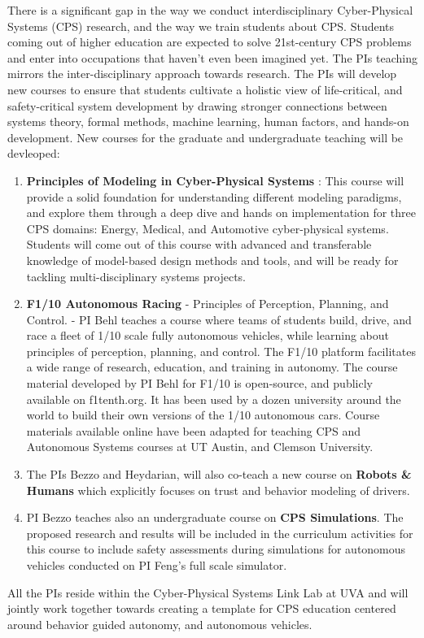 There is a significant gap in the way we conduct interdisciplinary Cyber-Physical Systems (CPS) research, and the way we train students about CPS. Students coming out of higher education are expected to solve 21st-century CPS problems and enter into occupations that haven’t even been imagined yet. The PIs teaching mirrors the inter-disciplinary approach towards research. 
The PIs will develop new courses to ensure that students cultivate a holistic view of life-critical, and safety-critical system development by drawing stronger connections between systems theory, formal methods, machine learning, human factors, and hands-on development.
New courses for the graduate and undergraduate teaching will be devleoped:
\begin{enumerate}[itemsep=0pt,parsep=0pt,topsep=4pt,leftmargin=0.4in]
    \item \textbf{Principles of Modeling in Cyber-Physical Systems} : This course will provide a solid foundation for understanding different modeling paradigms, and explore them through a deep dive and hands on implementation for three CPS domains: Energy, Medical, and Automotive cyber-physical systems. Students will come out of this course with advanced and transferable knowledge of model-based design methods and tools, and will be ready for tackling multi-disciplinary systems projects. 
    \item \textbf{F1/10 Autonomous Racing} - Principles of Perception, Planning, and Control. - PI Behl teaches a course where teams of students build, drive, and race a fleet of 1/10 scale fully autonomous vehicles, while learning about principles of perception, planning, and control. The F1/10 platform facilitates a wide range of research, education, and training in autonomy. The course material developed by PI Behl for F1/10 is open-source, and publicly available on f1tenth.org. It has been used by a dozen university around the world to build their own versions of the 1/10 autonomous cars. Course materials available online have been adapted for teaching CPS and Autonomous Systems courses at UT Austin, and Clemson University.
    \item The PIs Bezzo and Heydarian, will also co-teach a new course on \textbf{Robots \& Humans} which explicitly focuses on trust and behavior modeling of drivers. 
    \item PI Bezzo teaches also an undergraduate course on \textbf{CPS Simulations}. The proposed research and results will be included in the curriculum activities for this course to include safety assessments during simulations for autonomous vehicles conducted on PI Feng's full scale simulator.
\end{enumerate}
All the PIs reside within the Cyber-Physical Systems Link Lab at UVA and will jointly work together towards creating a template for CPS education centered around behavior guided autonomy, and autonomous vehicles. 

